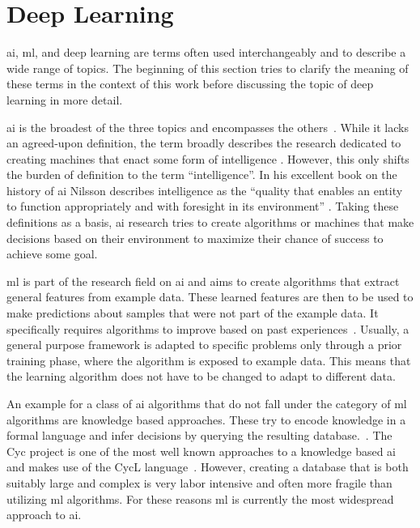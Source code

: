\section{Deep Learning}\label{sec:deep_learning}
\acrfull{ai}, \acrfull{ml}, and deep learning are terms often used interchangeably and to describe a wide range of topics. The beginning of this section tries to clarify the meaning of these terms in the context of this work before discussing the topic of deep learning in more detail.

\acrshort{ai} is the broadest of the three topics and encompasses the others~\cite{Goodfellow:2016:DNN}. 
While it lacks an agreed-upon definition, the term broadly describes the research dedicated to creating machines that enact some form of intelligence \cite{nilsson:2009}. However, this only shifts the burden of definition to the term ``intelligence''. In his excellent book on the history of \acrshort{ai} Nilsson describes intelligence as the ``quality that enables an entity to function appropriately and with foresight in its environment'' \cite{nilsson:2009}. Taking these definitions as a basis, \acrshort{ai} research tries to create algorithms or machines that make decisions based on their environment to maximize their chance of success to achieve some goal.

\acrshort{ml} is part of the research field on \acrshort{ai} and aims to create algorithms that extract general features from example data. These learned features are then to be used to make predictions about samples that were not part of the example data. It specifically requires algorithms to improve based on past experiences~\cite{Goodfellow:2016:DNN}. 
Usually, a general purpose framework is adapted to specific problems only through a prior training phase, where the algorithm is exposed to example data. This means that the learning algorithm does not have to be changed to adapt to different data.

An example for a class of \acrshort{ai} algorithms that do not fall under the category of \acrshort{ml} algorithms are knowledge based approaches. These try to encode knowledge in a formal language and infer decisions by querying the resulting database.~\cite{Goodfellow:2016:DNN}. 
The Cyc project is one of the most well known approaches to a knowledge based \acrshort{ai} and makes use of the CycL language~\cite{Lenat:1989aaa}. However, creating a database that is both suitably large and complex is very labor intensive and often more fragile than utilizing \acrshort{ml} algorithms. For these reasons \acrshort{ml} is currently the most widespread approach to \acrshort{ai}.

